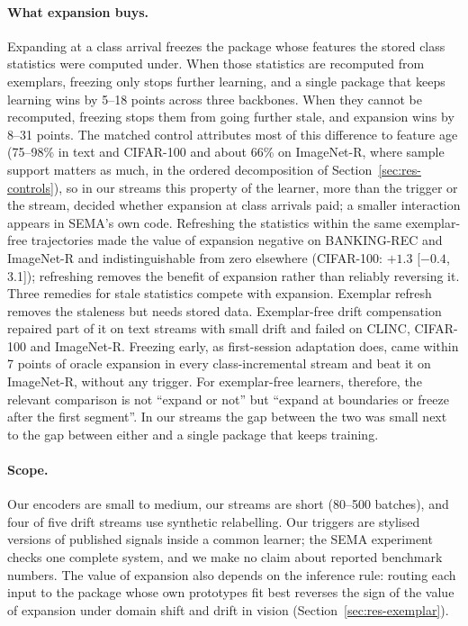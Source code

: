 \documentclass[10pt]{article}
\begin{document}
\paragraph{What expansion buys.} Expanding at a class arrival freezes the package whose features the stored class statistics were computed under. When those statistics are recomputed from exemplars, freezing only stops further learning, and a single package that keeps learning wins by 5--18 points across three backbones. When they cannot be recomputed, freezing stops them from going further stale, and expansion wins by 8--31 points. The matched control attributes most of this difference to feature age (75--98\% in text and CIFAR-100 and about 66\% on ImageNet-R, where sample support matters as much, in the ordered decomposition of Section~\ref{sec:res-controls}), so in our streams this property of the learner, more than the trigger or the stream, decided whether expansion at class arrivals paid; a smaller interaction appears in SEMA's own code. Refreshing the statistics within the same exemplar-free trajectories made the value of expansion negative on BANKING-REC and ImageNet-R and indistinguishable from zero elsewhere (CIFAR-100: $+1.3$ [$-0.4$, 3.1]); refreshing removes the benefit of expansion rather than reliably reversing it. Three remedies for stale statistics compete with expansion. Exemplar refresh removes the staleness but needs stored data. Exemplar-free drift compensation repaired part of it on text streams with small drift and failed on CLINC, CIFAR-100 and ImageNet-R. Freezing early, as first-session adaptation does, came within 7 points of oracle expansion in every class-incremental stream and beat it on ImageNet-R, without any trigger. For exemplar-free learners, therefore, the relevant comparison is not ``expand or not'' but ``expand at boundaries or freeze after the first segment''. In our streams the gap between the two was small next to the gap between either and a single package that keeps training.

\paragraph{Scope.} Our encoders are small to medium, our streams are short (80--500 batches), and four of five drift streams use synthetic relabelling. Our triggers are stylised versions of published signals inside a common learner; the SEMA experiment checks one complete system, and we make no claim about reported benchmark numbers. The value of expansion also depends on the inference rule: routing each input to the package whose own prototypes fit best reverses the sign of the value of expansion under domain shift and drift in vision (Section~\ref{sec:res-exemplar}).
\end{document}
